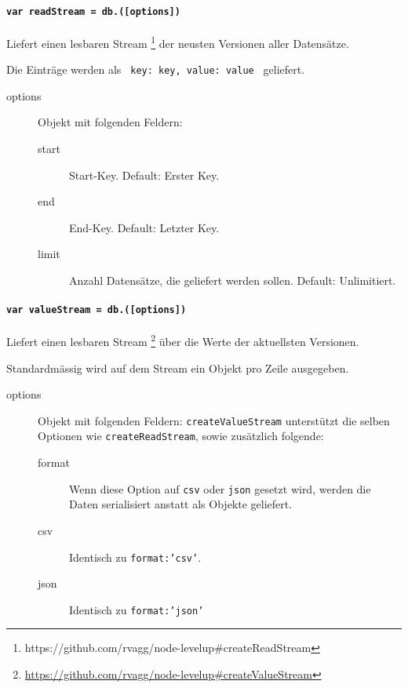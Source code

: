 \paragraph{\texttt{var readStream = db.([options])}}
Liefert einen lesbaren Stream \footnote{https://github.com/rvagg/node-levelup\#createReadStream} der neusten Versionen aller Datensätze.

Die Einträge werden als \texttt{ {key: key, value: value} } geliefert.

\begin{description}
\item[options] Objekt mit folgenden Feldern:
    \begin{description}
    \item[start] Start-Key. Default: Erster Key.
    \item[end] End-Key. Default: Letzter Key.
    \item[limit] Anzahl Datensätze, die geliefert werden sollen. Default: Unlimitiert.
    \end{description}
\end{description}


\paragraph{\texttt{var valueStream = db.([options])}}
Liefert einen lesbaren Stream \footnote{\url{https://github.com/rvagg/node-levelup\#createValueStream}} über die Werte der aktuellsten Versionen.

Standardmässig wird auf dem Stream ein Objekt pro Zeile ausgegeben.

\begin{description}
\item[options] Objekt mit folgenden Feldern:
    \texttt{createValueStream} unterstützt die selben Optionen wie \texttt{createReadStream}, sowie zusätzlich folgende:
    \begin{description}
    \item[format] Wenn diese Option auf \texttt{csv} oder \texttt{json} gesetzt wird, werden die Daten serialisiert anstatt als Objekte geliefert.
    \item[csv] Identisch zu \texttt{format:'csv'}.
    \item[json] Identisch zu \texttt{format:'json'}
    \end{description}
\end{description}

